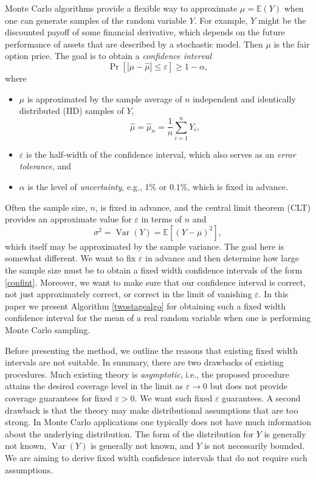 \documentclass[graybox]{svmult}
\newcommand\e{\mathbb{E}}
\newcommand{\Prob}{\Pr}
\newcommand{\abs}[1]{\left|#1\right|}
\DeclareMathOperator{\var}{Var}
\newcommand{\hmu}{\hat{\mu}}
\def\abs#1{\ensuremath{\left \lvert #1 \right \rvert}}
\begin{document}
Monte Carlo algorithms provide a flexible way to approximate $\mu = \e(Y)$ when one can generate samples of the random variable $Y$. For example, $Y$ might be the discounted payoff of some financial derivative, which depends on the future performance of assets that are described by a stochastic model.  Then $\mu$ is the fair option price.  The goal is to obtain a \emph{confidence interval} 
\begin{equation} \label{confint}
\Prob[\abs{\mu - \hmu} \le \varepsilon] \ge 1-\alpha,
\end{equation}
where 
\begin{itemize}

\item $\mu$ is approximated by the sample average of $n$ independent and identically distributed (IID) samples of $Y$,
\begin{equation} \label{eq:samplemean}
\hmu = \hmu_n=\frac 1n \sum_{i=1}^n Y_i,
\end{equation}

\item $\varepsilon$ is the half-width of the confidence interval, which also serves as an \emph{error tolerance}, and

\item $\alpha$ is the level of \emph{uncertainty}, e.g., $1\%$ or $0.1\%$, which is fixed in advance.

\end{itemize}

Often the sample size, $n$, is fixed in advance, and the central limit theorem (CLT) provides an approximate value for $\varepsilon$ in terms of $n$ and 
\begin{equation} \label{sigmadef}
\sigma^2=\var(Y)=\e[(Y-\mu)^2],
\end{equation}
which itself may be approximated by the sample variance.
The goal here is somewhat different.  We want to fix $\varepsilon$ in advance and then determine how large the sample size must be to obtain a fixed
width confidence intervals of the form \eqref{confint}. Moreover, we want to make sure that our confidence interval is correct, not just approximately correct, or correct in the limit of vanishing $\varepsilon$.  In this paper we present Algorithm \ref{twostagealgo} for obtaining such a fixed width confidence interval for the mean of a real random
variable when one is performing Monte Carlo sampling.

Before presenting the method, we outline the reasons
that existing fixed width intervals are not suitable.  In summary, there are two drawbacks of existing procedures.  Much existing theory is \emph{asymptotic}, i.e., the proposed procedure attains the desired coverage level in the limit as $\varepsilon\to 0$ but does not provide
coverage guarantees for fixed $\varepsilon>0$.  We want such fixed $\varepsilon$ guarantees.  A second drawback is that the theory may make distributional assumptions that are too strong.  In Monte Carlo applications one typically does not have much information about the underlying distribution.  The form of the distribution for $Y$ is generally not known, $\var(Y)$ is generally not known, and $Y$ is not necessarily bounded. We are aiming to derive fixed width confidence intervals that do not require such assumptions.  
\end{document}
